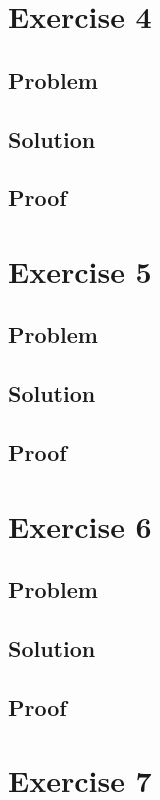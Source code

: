 \documentclass[a4paper,11pt]{article}
\begin{document}
\section{Exercise 4}
\subsection{Problem}

\subsection{Solution}

\subsection{Proof}

\section{Exercise 5}
\subsection{Problem}

\subsection{Solution}

\subsection{Proof}

\section{Exercise 6}
\subsection{Problem}

\subsection{Solution}

\subsection{Proof}

\section{Exercise 7}
\end{document}
